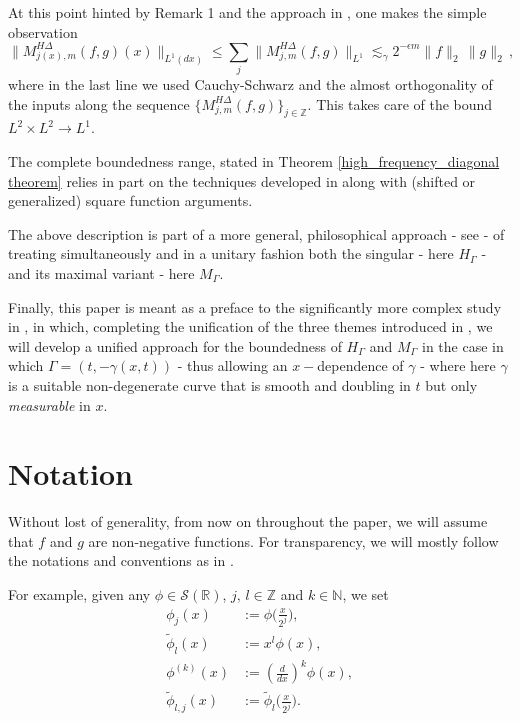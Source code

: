 \documentclass{amsart}
\newcommand{\R}{\mathbb{R}}
\newcommand{\Z}{\mathbb{Z}}
\newcommand{\N}{\mathbb{N}}
\newcommand{\s}{\mathcal{S}}
\def\G{\Gamma}
\newcommand{\g}{\gamma}
\theoremstyle{definition}
\theoremstyle{remark}
\numberwithin{equation}{section}
\begin{document}
\begin{itemize}
At this point hinted by Remark 1 and the approach in \cite{lie2015boundedness}, one makes the simple observation
\begin{equation}\label{l2css}
 \|M^{H\Delta}_{j(x),m}(f,g)(x)\|_{L^1(dx)}\leq \sum_{j} \|M^{H\Delta}_{j,m}(f,g)\|_{L^1}\lesssim_{\gamma} 2^{-\epsilon m}\|f\|_2\,\|g\|_{2}\,,
\end{equation}
where in the last line we used Cauchy-Schwarz and the almost orthogonality of the inputs along the sequence $\{M^{H\Delta}_{j,m}(f,g)\}_{j\in\Z}$. This takes care of the bound $L^2\times L^2 \to L^1$.

The complete boundedness range, stated in Theorem \ref{high_frequency_diagonal theorem} relies in part on the techniques developed in \cite{lie2015triangle} along with (shifted or generalized) square function arguments.
\end{itemize}


The above description is part of a more general, philosophical approach - see \cite{lie2019unifiedap} - of treating simultaneously and in a unitary fashion both the singular - here $H_{\Gamma}$ - and its maximal variant - here $M_{\G}$.

Finally, this paper is meant as a preface to the significantly more complex study in \cite{lvUA3}, in which, completing the unification of the three themes introduced in \cite{lie2019unifiedap}, we will develop a unified approach for the boundedness of $H_{\G}$ and $M_{\G}$ in the case in which $\Gamma=(t,-\gamma(x,t))$ - thus allowing an $x-$dependence of $\g$ - where here $\g$ is a suitable non-degenerate curve that is smooth and doubling in $t$ but only \emph{measurable} in $x$.



\section{Notation}

Without lost of generality, from now on throughout the paper, we will assume that $f$ and $g$ are non-negative functions. For transparency, we will mostly follow the notations and conventions as in \cite{lie2015boundedness}.

For example, given any $\phi\in\s(\R)$, $j,\,l\in\Z$ and $k\in\N$, we set
\begin{align}
\phi_j(x)&:=\phi\big(\frac{x}{2^j}\big),\label{notation2}\\
\tilde\phi_{l}(x)&:=x^l\phi(x),\label{notation21}\\
\phi^{(k)}(x)&:=\left(\frac{d}{dx}\right)^k\phi(x),\label{notation22}\\
\tilde\phi_{l,j}(x)&:=\tilde\phi_l\big(\frac{x}{2^j}\big). \label{notation23}
\end{align}
\end{document}

